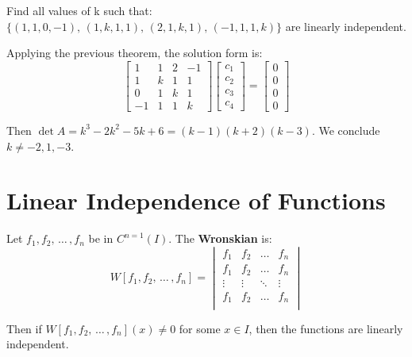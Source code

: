 \documentclass[../main.tex]{subfiles}
\begin{document}
\begin{example}[]
    Find all values of k such that: \( \{ (1,1,0,-1), \, (1,k,1,1), \, (2,1,k,1), \, (-1,1,1,k)\} \) are linearly independent.

    Applying the previous theorem, the solution form is:
    \[
    \begin{bmatrix}
        1 & 1 & 2 & -1 \\
        1 & k & 1 & 1 \\
        0 & 1 & k & 1 \\
        -1 & 1 & 1 & k
    \end{bmatrix}
    \begin{bmatrix}
        c_1 \\ c_2 \\ c_3 \\ c_4
    \end{bmatrix}
    =
    \begin{bmatrix}
        0 \\ 0 \\ 0 \\ 0
    \end{bmatrix}
    \]

    Then \( \det A =  k^3 -2k^2 -5k +6 = (k-1)(k+2)(k-3) \).
    We conclude \( \boxed{k \neq -2, 1, -3} \).
\end{example}


\section{Linear Independence of Functions}

\begin{definition}[Wronskian]
    Let \( f_1, f_2, \, \dots \, , f_n \) be in \( C^{n=1}(I) \).
    The \textbf{Wronskian} is:
    \[ W[f_1, f_2, \, \dots \, , f_n] = \begin{vmatrix}
        f_1 & f_2 & \dots & f_n \\
        f_1 & f_2 & \dots & f_n \\
        \vdots & \vdots & \ddots & \vdots \\
        f_1 & f_2 & \dots & f_n \\
    \end{vmatrix} \]
\end{definition}

Then if \( W[f_1, f_2, \, \dots \, , f_n](x) \neq 0 \) for some \( x \in I \), then the functions are linearly independent.
\end{document}
